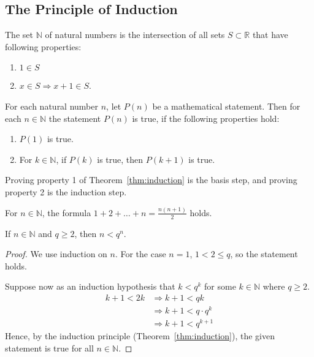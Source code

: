 \documentclass[../main.tex]{subfiles}
\begin{document}
\subsection{The Principle of Induction}
\begin{defn} \label{def:n}
    The set $\mathbb N$ of \textsf{natural numbers} is the intersection of all sets $S \subset \mathbb R$ that have following properties:
    \begin{enumerate}
        \item $1 \in S$
        \item $x \in S \Rightarrow x + 1 \in S$.
    \end{enumerate}
\end{defn}

\begin{thm} \label{thm:induction}
    For each natural number $n$, let $P(n)$ be a mathematical statement.
    Then for each $n \in \mathbb N$ the statement $P(n)$ is true, if the following properties hold:
    \begin{enumerate}
        \item $P(1)$ is true.
        \item For $k \in \mathbb N$, if $P(k)$ is true, then $P(k+1)$ is true.
    \end{enumerate}
\end{thm}

Proving property 1 of Theorem~\ref{thm:induction} is the \textsf{basis step}, and proving property 2 is the \textsf{induction step}.

\begin{prop}
    For $n \in \mathbb N$, the formula $1 + 2 + \dots + n = \frac{n(n + 1)}{2}$ holds.
\end{prop}

\begin{prop}
    If $n \in \mathbb N$ and $q \geq 2$, then $n < q^n$.
\end{prop}
\begin{proof}
    We use induction on $n$.
    For the case $n = 1$, $1 < 2 \leq q$, so the statement holds.

    Suppose now as an induction hypothesis that $k < q^k$ for some $k \in \mathbb N$ where $q \geq 2$.
    \begin{align*}
        k + 1 < 2k &\Rightarrow k + 1 < qk\\
                   &\Rightarrow k + 1 < q \cdot q^k\\
                   &\Rightarrow k + 1 < q^{k + 1}
    \end{align*}
    Hence, by the induction principle (Theorem~\ref{thm:induction}), the given statement is true for all $n \in \mathbb N$.
\end{proof}
\end{document}

